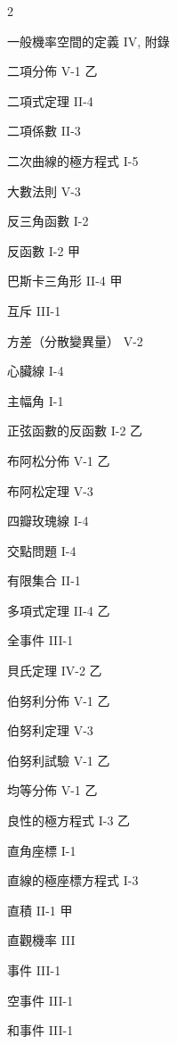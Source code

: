 \setlength{\columnsep}{2.5em}
\begin{multicols}{2}

\noindent 一般機率空間的定義 \dotfill IV, 附錄

\noindent 二項分佈 \dotfill V-1 乙\par
\noindent 二項式定理 \dotfill II-4\par
\noindent 二項係數 \dotfill II-3\par
\noindent 二次曲線的極方程式 \dotfill I-5

\noindent 大數法則 \dotfill V-3

\noindent 反三角函數 \dotfill I-2\par
\noindent 反函數 \dotfill I-2 甲\par
\noindent 巴斯卡三角形 \dotfill II-4 甲\par
\noindent 互斥 \dotfill III-1\par
\noindent 方差（分散變異量） \dotfill V-2\par
\noindent 心臟線 \dotfill I-4

\noindent 主幅角 \dotfill I-1\par
\noindent 正弦函數的反函數 \dotfill I-2 乙\par
\noindent 布阿松分佈 \dotfill V-1 乙\par
\noindent 布阿松定理 \dotfill V-3\par
\noindent 四瓣玫瑰線 \dotfill I-4

\noindent 交點問題 \dotfill I-4\par
\noindent 有限集合 \dotfill II-1\par
\noindent 多項式定理 \dotfill II-4 乙\par
\noindent 全事件 \dotfill III-1

\noindent 貝氏定理 \dotfill IV-2 乙\par
\noindent 伯努利分佈 \dotfill V-1 乙\par
\noindent 伯努利定理 \dotfill V-3\par
\noindent 伯努利試驗 \dotfill V-1 乙\par
\noindent 均等分佈 \dotfill V-1 乙\par
\noindent 良性的極方程式 \dotfill I-3 乙

\noindent 直角座標 \dotfill I-1\par
\noindent 直線的極座標方程式 \dotfill I-3\par
\noindent 直積 \dotfill II-1 甲\par
\noindent 直觀機率 \dotfill III\par
\noindent 事件 \dotfill III-1\par
\noindent 空事件 \dotfill III-1\par
\noindent 和事件 \dotfill III-1


\end{multicols}
